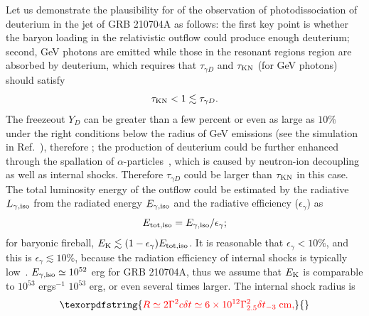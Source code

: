 \documentclass[linenumbers,twocolumn]{aastex631}
\providecommand{\DIFaddtex}[1]{{\protect\color{blue} \sf #1}} %
\providecommand{\DIFdeltex}[1]{{\protect\color{red} \scriptsize #1}} %
\providecommand{\DIFaddbegin}{} %
\providecommand{\DIFaddend}{} %
\providecommand{\DIFdelbegin}{} %
\providecommand{\DIFdelend}{} %
\providecommand{\DIFadd}[1]{\texorpdfstring{\DIFaddtex{#1}}{#1}} %
\providecommand{\DIFdel}[1]{\texorpdfstring{\DIFdeltex{#1}}{}} %
\begin{document}
Let us demonstrate
the plausibility \DIFdelbegin \DIFdel{for }\DIFdelend \DIFaddbegin \DIFadd{of }\DIFaddend the observation of photodissociation of deuterium in the jet of GRB 210704A as follows: the \DIFaddbegin \DIFadd{first }\DIFaddend key point is whether \DIFaddbegin \DIFadd{the }\DIFaddend baryon loading in \DIFaddbegin \DIFadd{the }\DIFaddend relativistic outflow could produce enough deuterium;
second, GeV photons are emitted while those in the resonant \DIFdelbegin \DIFdel{regions }\DIFdelend \DIFaddbegin \DIFadd{region }\DIFaddend are absorbed by deuterium, which requires that $\tau_{\gamma D}$ and $\tau_{\rm KN}$ (for GeV photons) \DIFdelbegin \DIFdel{should }\DIFdelend satisfy
\begin{equation}\label{eq:criterion}
    \tau_{\rm KN}<1\lesssim\tau_{\gamma D}.
\end{equation}
The freezeout $Y_{D}$ can be greater than a few percent or even as large as $10\%$ under the right conditions below the radius of GeV emissions \DIFdelbegin \DIFdel{(see the simulation in Ref.~\citep[][]{2002ApJ...580..368P}), therefore }\DIFdelend \DIFaddbegin \DIFadd{\citep[see the simulation in][]{2002ApJ...580..368P}; the production of deuterium could be further enhanced through the spallation of $\alpha$-particles~\citep{2003ApJ...588..931B}, which is caused by neutron-ion decoupling as well as internal shocks. Therefore }\DIFaddend $\tau_{\gamma D}$ could be larger than $\tau_{\rm KN}$ in this case. The total \DIFdelbegin \DIFdel{luminosity }\DIFdelend \DIFaddbegin \DIFadd{energy }\DIFaddend of the outflow could be estimated \DIFdelbegin \DIFdel{by the radiative $L_{\gamma, \rm iso}$ }\DIFdelend \DIFaddbegin \DIFadd{from the radiated energy $E_{\gamma, \rm iso}$ }\DIFaddend and the radiative efficiency ($\epsilon_\gamma$) as
\begin{equation}
    E_{\rm tot, iso}= E_{\gamma, \rm iso}/\epsilon_\gamma;
\end{equation}
for baryonic fireball, $E_{\rm K}\lesssim (1-\epsilon_\gamma)E_{\rm tot, iso}$.
It is reasonable that \DIFdelbegin \DIFdel{$\epsilon_\gamma<10\%$, and this is }\DIFdelend \DIFaddbegin \DIFadd{$\epsilon_\gamma\lesssim10\%$, }\DIFaddend because the radiation efficiency of internal shocks is typically low~\citep[][]{2011ApJ...726...90Z,2008FrPhC...3..306F}. $E_{\gamma, \rm iso}\simeq 10^{52}$ erg for GRB 210704A, thus we assume that $E_{\rm K}$ is comparable to \DIFdelbegin \DIFdel{$ 10^{53}$ ergs$^{-1}$}\DIFdelend \DIFaddbegin \DIFadd{$10^{53}$ erg}\DIFaddend , or even several times larger. The internal shock radius \DIFdelbegin \DIFdel{is 
}\begin{displaymath}
\DIFdel{R \simeq 2 \Gamma^2 c \delta t \simeq 6 \times 10^{12} \Gamma_{2.5}^2 \delta t_{-3} \ {\rm cm},
}\end{displaymath}%
\end{document}
